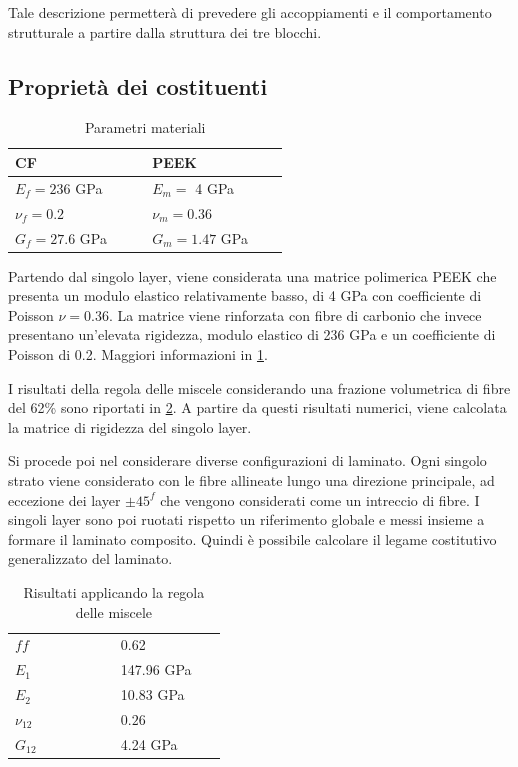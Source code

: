 \documentclass[a4paper,num-refs]{oup-contemporary}
\begin{document}
Tale descrizione permetterà di prevedere gli accoppiamenti e il comportamento strutturale a partire dalla struttura dei tre blocchi. 


\subsection{Proprietà dei costituenti}

\begin{table}[bt!]
	\centering
	\captionsetup{justification=centering}
	
	\caption{Parametri materiali \citep{Gallagher}}

	\begin{tabular}{ m{0.4\linewidth} m{0.4\linewidth}  }
		\toprule
		CF & PEEK\\
		\midrule
		$E_{f}=236$ GPa & $E_{m}=$ 4 GPa   \\
		$\nu_{f}= 0.2$ & $\nu_{m}= 0.36$ \\
		$G_f=27.6 $ GPa & $G_m=1.47$ GPa \\
		\bottomrule
	\end{tabular}
	\label{tab:parametri}
\end{table}

Partendo dal singolo layer, viene considerata una matrice polimerica PEEK che presenta un modulo elastico relativamente basso, di 4 GPa con coefficiente di Poisson $\nu =0.36$. La matrice  viene rinforzata con fibre di carbonio che invece presentano un'elevata rigidezza, modulo elastico di 236 GPa e un coefficiente di Poisson di 0.2. Maggiori informazioni in \cref{tab:parametri}. 

I risultati della regola delle miscele considerando una frazione volumetrica di fibre del 62\% sono riportati in \cref{tab:miscele}.  A partire da questi risultati numerici, viene calcolata la matrice di rigidezza del singolo layer. 

Si procede poi nel considerare diverse configurazioni di laminato. Ogni singolo strato viene considerato con le fibre allineate lungo una direzione principale, ad eccezione dei layer $\pm 45^f$ che vengono considerati come un intreccio di fibre. I singoli layer sono poi ruotati rispetto un riferimento globale e messi insieme a formare il laminato composito. Quindi è possibile calcolare il legame costitutivo generalizzato del laminato.

\begin{table}[h!]
	\centering	
	\begin{tabular}{ m{0.4\linewidth} m{0.4\linewidth}  }
		\toprule
		$ff$  & 0.62 \\
		$E_{1}$  & 147.96 GPa  \\
		$E_{2}$  & 10.83 GPa  \\
		$\nu_{12}$ & $0.26$ \\
		$G_{12}$ & 4.24 GPa \\
		\bottomrule
	\end{tabular}
	\captionsetup{justification=centering}
	\caption{Risultati applicando la regola delle miscele}
	\label{tab:miscele}
\end{table}
\end{document}
